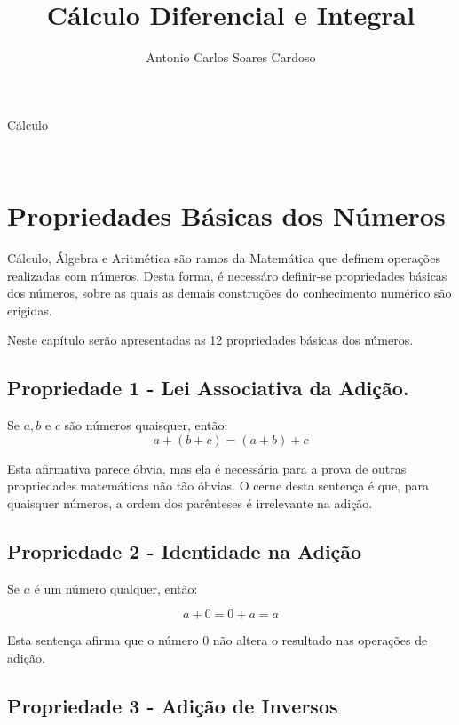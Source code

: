\documentclass[
    12pt, %
    openright,
    twoside, %
    a4paper, %
    article,
    english,brazil %
]{abntex2}
\author{Antonio Carlos Soares Cardoso}
\title{Cálculo Diferencial e Integral}
\makeatletter
\renewcommand\tableofcontents{%
  \null\hfill\textbf{\Large\contentsname}\hfill\null\par
  \@mkboth{\MakeUppercase\contentsname}{\MakeUppercase\contentsname}%
  \@starttoc{toc}%
}
\makeatother
\begin{document}
\begin{capa}
    \center
    \ABNTEXchapterfont\Large Cálculo\\
    \vspace*{1cm}
    {\ABNTEXchapterfont\large\imprimirautor}
    \vfill
    \begin{center}
    \ABNTEXchapterfont\bfseries\LARGE\imprimirtitulo
    \end{center}
    \vfill
    \large\imprimirlocal \\
    \large\imprimirdata
    \vspace*{1cm}
\end{capa}

\tableofcontents

\newpage

\textual

\section{Propriedades Básicas dos Números}

Cálculo, Álgebra e Aritmética são ramos da Matemática que definem operações realizadas com números. Desta forma, é necessáro definir-se propriedades básicas dos números, sobre as quais as demais construções do conhecimento numérico são erigidas. 

Neste capítulo serão apresentadas as 12 propriedades básicas dos números.

\subsection{Propriedade 1 - Lei Associativa da Adição.}
Se $a,b$ e $c$ são números quaisquer, então: 
$$ a+(b+c)=(a+b)+c $$

Esta afirmativa parece óbvia, mas ela é necessária para a prova de outras propriedades matemáticas não tão óbvias. O cerne desta sentença é que, para quaisquer números, a ordem dos parênteses é irrelevante na adição. 

\subsection{Propriedade 2 - Identidade na Adição}

Se $a$ é um número qualquer, então: 

$$a+0=0+a=a$$

Esta sentença afirma que o número $0$ não altera o resultado nas operações de adição.

\subsection{Propriedade 3 - Adição de Inversos}
\end{document}
